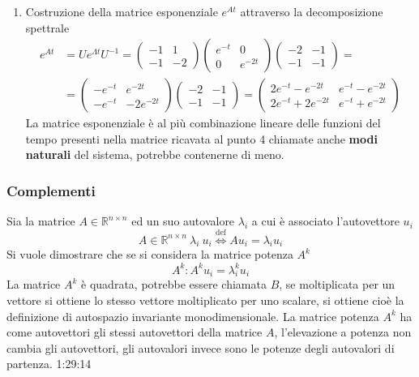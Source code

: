 \begin{enumerate}
\item Costruzione della matrice esponenziale $e^{At}$ attraverso la
decomposizione spettrale
$$\begin{aligned}
e^{At} &= Ue^{\Lambda t} U^{-1} = \begin{pmatrix}
                                    -1 & 1 \\
                                    -1 & -2
                                    \end{pmatrix} \begin{pmatrix}
                                                e^{-t} & 0 \\
                                                0 & e^{-2t}
                                                \end{pmatrix} \begin{pmatrix}
                                                -2 & -1 \\
                                                -1 & -1
                                                \end{pmatrix} = \\
    &= \begin{pmatrix}
        -e^{-t} & e^{-2t} \\
        -e^{-t} & -2e^{-2t}
        \end{pmatrix}\begin{pmatrix}
                    -2 & -1 \\
                    -1 & -1
                    \end{pmatrix} = \begin{pmatrix}
                                    2e^{-t}-e^{-2t} & e^{-t}-e^{-2t}\\
                                    2e^{-t}+2e^{-2t} & e^{-t}+e^{-2t}
                                    \end{pmatrix}
\end{aligned}$$
La matrice esponenziale è al più combinazione lineare delle funzioni del tempo
presenti nella matrice ricavata al punto 4 chiamate anche \textbf{modi
naturali} del sistema, potrebbe contenerne di meno.
\end{enumerate}

\subsubsection{Complementi}
Sia la matrice $A\in\mathbb{R}^{n\times n}$ ed un suo autovalore $\lambda_i$ a
cui è associato l'autovettore $u_i$
$$
A\in\mathbb{R}^{n\times n}\ \lambda_i\ u_i
\stackrel{\text{def}}{\Leftrightarrow} Au_i = \lambda_iu_i
$$
Si vuole dimostrare che se si considera la matrice potenza $A^k$
$$
A^k : A^ku_i = \lambda_i^ku_i
$$
La matrice $A^k$ è quadrata, potrebbe essere chiamata $B$, se moltiplicata per
un vettore si ottiene lo stesso vettore moltiplicato per uno scalare, si
ottiene cioè la definizione di autospazio invariante monodimensionale.
La matrice potenza $A^k$ ha come autovettori gli stessi autovettori della
matrice $A$, l'elevazione a potenza non cambia gli autovettori, gli autovalori
invece sono le potenze degli autovalori di partenza.
1:29:14

